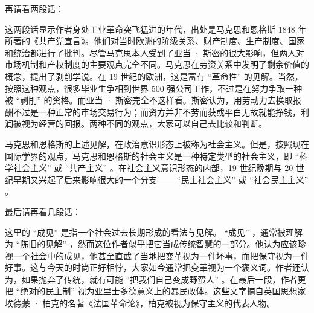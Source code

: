 再请看两段话：


这两段话显示作者身处工业革命突飞猛进的年代，出处是马克思和恩格斯 1848 年所著的《共产党宣言》。他们对当时欧洲的阶级关系、财产制度、生产制度、国家和统治都进行了批判。尽管马克思本人受到了亚当 · 斯密的很大影响，但两人对市场机制和产权制度的主要观点完全不同。马克思在劳资关系中发明了剩余价值的概念，提出了剥削学说。在 19 世纪的欧洲，这是富有 “革命性” 的见解。当然，按照这种观点，很多毕业生争相到世界 500 强公司工作，不过是在努力争取一种被 “剥削” 的资格。而亚当 · 斯密完全不这样看。斯密认为，用劳动力去换取报酬不过是一种正常的市场交易行为；而资方并非不劳而获或平白无故就能挣钱，利润被视为经营的回报。两种不同的观点，大家可以自己去比较和判断。

马克思和恩格斯的上述见解，在政治意识形态上被称为社会主义。但是，按照现在国际学界的观点，马克思和恩格斯的社会主义是一种特定类型的社会主义，即 “科学社会主义” 或 “共产主义” 。在社会主义意识形态的内部，19 世纪晚期与 20 世纪早期又兴起了后来影响很大的一个分支—— “民主社会主义” 或 “社会民主主义” 。

最后请再看几段话：


这里的 “成见” 是指一个社会过去长期形成的看法与见解。 “成见” ，通常被理解为 “陈旧的见解” ，然而这位作者似乎把它当成传统智慧的一部分。他认为应该珍视一个社会中的成见，他甚至直截了当地把变革视为一件坏事，而把保守视为一件好事。这与今天的时尚正好相悖，大家如今通常把变革视为一个褒义词。作者还认为，如果抛弃了传统，就有可能 “把我们自己变成野蛮人” 。在最后一段，作者更把 “绝对的民主制” 视为亚里士多德意义上的暴民政体。这些文字摘自英国思想家埃德蒙 · 柏克的名著《法国革命论》，柏克被视为保守主义的代表人物。


